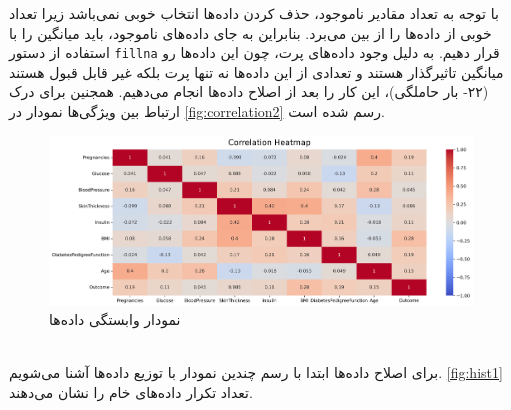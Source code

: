 \documentclass[11pt]{article}
\begin{document}
	با توجه به تعداد مقادیر ناموجود، حذف کردن داده‌ها انتخاب خوبی نمی‌باشد زیرا تعداد خوبی از داده‌ها را از بین می‌برد. بنابراین به جای داده‌های ناموجود، باید میانگین را با استفاده از دستور 
	\verb|fillna|
	قرار دهیم. به دلیل وجود داده‌های پرت، چون این داده‌ها رو میانگین تاثیر‌گذار هستند و تعدادی از این داده‌ها نه تنها پرت بلکه غیر قابل قبول هستند (۲۲- بار حاملگی)، این کار را بعد از اصلاح داده‌ها انجام می‌دهیم. همجنین برای درک ارتباط بین ویژگی‌ها نمودار 
	در
	\autoref{fig:correlation2}
	رسم شده است.\\
	\begin{figure}[!h]
		\centerline{\includegraphics[width=1\linewidth]{../HW2_2/CorrelationHeatmap.png}}
		\caption{نمودار وابستگی داده‌ها}
		\label{fig:correlation2}
	\end{figure}\\
	برای اصلاح داده‌ها ابتدا با رسم چندین نمودار با توزیع داده‌ها آشنا می‌شویم. 
	\autoref{fig:hist1}
	تعداد تکرار داده‌های خام را نشان می‌دهند.
\end{document}
